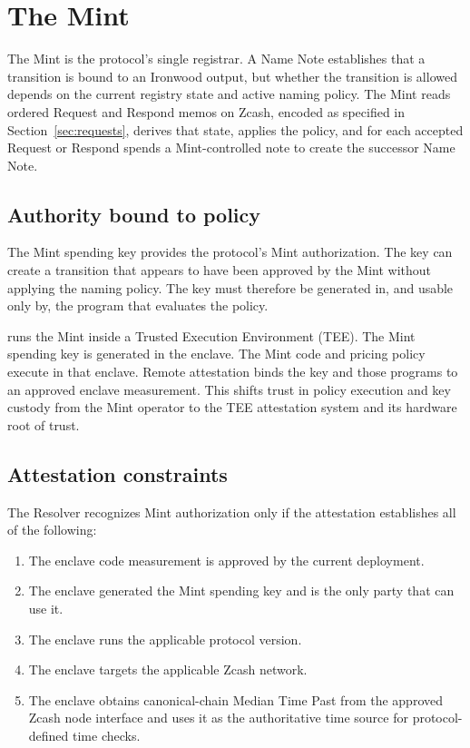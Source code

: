 \section{The Mint}
\label{sec:the-mint}

The Mint is the protocol's single registrar. A Name Note establishes that a transition is bound to an Ironwood output, but whether the transition is allowed depends on the current registry state and active naming policy. The Mint reads ordered Request and Respond memos on Zcash, encoded as specified in Section~\ref{sec:requests}, derives that state, applies the policy, and for each accepted Request or Respond spends a Mint-controlled note to create the successor Name Note.

\subsection{Authority bound to policy}

The Mint spending key provides the protocol's Mint authorization. The key can create a transition that appears to have been approved by the Mint without applying the naming policy. The key must therefore be generated in, and usable only by, the program that evaluates the policy.

\zns{} runs the Mint inside a Trusted Execution Environment (TEE). The Mint spending key is generated in the enclave. The Mint code and pricing policy execute in that enclave. Remote attestation binds the key and those programs to an approved enclave measurement. This shifts trust in policy execution and key custody from the Mint operator to the TEE attestation system and its hardware root of trust.

\subsection{Attestation constraints}

The Resolver recognizes Mint authorization only if the attestation establishes all of the following:

\begin{enumerate}
  \item The enclave code measurement is approved by the current \zns{} deployment.
  \item The enclave generated the Mint spending key and is the only party that can use it.
  \item The enclave runs the applicable \zns{} protocol version.
  \item The enclave targets the applicable Zcash network.
  \item The enclave obtains canonical-chain Median Time Past from the approved Zcash node interface and uses it as the authoritative time source for protocol-defined time checks.
\end{enumerate}

